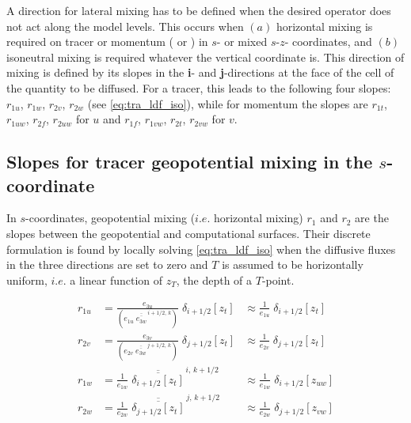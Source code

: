 \documentclass[../tex_main/NEMO_manual]{subfiles}
\begin{document}
A direction for lateral mixing has to be defined when the desired operator does not act along the model levels.
This occurs when $(a)$ horizontal mixing is required on tracer or momentum
( or ) in $s$- or mixed $s$-$z$- coordinates,
and $(b)$ isoneutral mixing is required whatever the vertical coordinate is.
This direction of mixing is defined by its slopes in the \textbf{i}- and \textbf{j}-directions at the face of
the cell of the quantity to be diffused.
For a tracer, this leads to the following four slopes:
$r_{1u}$, $r_{1w}$, $r_{2v}$, $r_{2w}$ (see \autoref{eq:tra_ldf_iso}),
while for momentum the slopes are  $r_{1t}$, $r_{1uw}$, $r_{2f}$, $r_{2uw}$ for $u$ and
$r_{1f}$, $r_{1vw}$, $r_{2t}$, $r_{2vw}$ for $v$. 


\subsection{Slopes for tracer geopotential mixing in the $s$-coordinate}

In $s$-coordinates, geopotential mixing ($i.e.$ horizontal mixing) $r_1$ and $r_2$ are the slopes between
the geopotential and computational surfaces.
Their discrete formulation is found by locally solving \autoref{eq:tra_ldf_iso} when
the diffusive fluxes in the three directions are set to zero and $T$ is assumed to be horizontally uniform,
$i.e.$ a linear function of $z_T$, the depth of a $T$-point. 

\begin{equation} \label{eq:ldfslp_geo}
\begin{aligned}
 r_{1u} &= \frac{e_{3u}}{ \left( e_{1u}\;\overline{\overline{e_{3w}}}^{\,i+1/2,\,k} \right)}
 			  \;\delta_{i+1/2}[z_t] 
 		&\approx \frac{1}{e_{1u}}\; \delta_{i+1/2}[z_t] \ \ \
\\
 r_{2v} &= \frac{e_{3v}}{\left( e_{2v}\;\overline{\overline{e_{3w}}}^{\,j+1/2,\,k} \right)} 
 			  \;\delta_{j+1/2} [z_t] 
		&\approx \frac{1}{e_{2v}}\; \delta_{j+1/2}[z_t] \ \ \
\\
 r_{1w} &= \frac{1}{e_{1w}}\;\overline{\overline{\delta_{i+1/2}[z_t]}}^{\,i,\,k+1/2}
 		&\approx \frac{1}{e_{1w}}\; \delta_{i+1/2}[z_{uw}] 
 \\
 r_{2w} &= \frac{1}{e_{2w}}\;\overline{\overline{\delta_{j+1/2}[z_t]}}^{\,j,\,k+1/2}
		&\approx \frac{1}{e_{2w}}\; \delta_{j+1/2}[z_{vw}] 
 \\
\end{aligned}
\end{equation}
\end{document}
